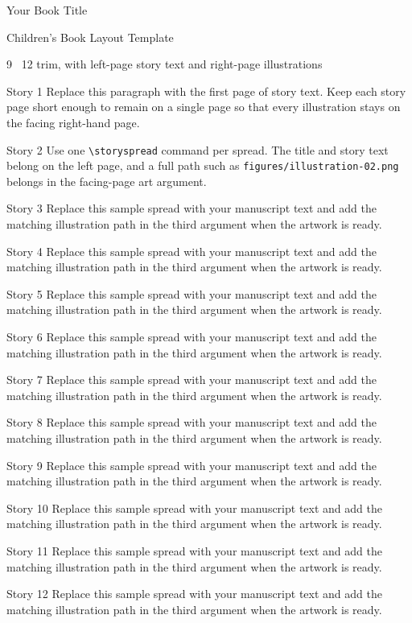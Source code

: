 \documentclass[10pt,twoside,openany]{book}
\newcommand{\booktitle}{Your Book Title}
\newcommand{\samplebookspread}[1]{%
  \storyspread
    {Story #1}
    {Replace this sample spread with your manuscript text and add the matching illustration path in the third argument when the artwork is ready.}
    {}
}
\begin{document}
\begin{titlepage}
  \thispagestyle{empty}
  \vspace*{\fill}
  \begin{center}
    {\chapterfont\fontsize{34}{40}\selectfont \booktitle\par}
    \vspace{1.5em}
    {\headingfont\fontsize{18}{24}\selectfont Children's Book Layout Template\par}
    \vspace{2em}
    {\Large 9 \texttimes\ 12 trim, with left-page story text and right-page illustrations\par}
  \end{center}
  \vspace*{\fill}
\end{titlepage}

\storyspread
  {Story 1}
  {Replace this paragraph with the first page of story text. Keep each story page short enough to remain on a single page so that every illustration stays on the facing right-hand page.}
  {}

\storyspread
  {Story 2}
  {Use one \texttt{\textbackslash storyspread} command per spread. The title and story text belong on the left page, and a full path such as \texttt{figures/illustration-02.png} belongs in the facing-page art argument.}
  {}

\samplebookspread{3}
\samplebookspread{4}
\samplebookspread{5}
\samplebookspread{6}
\samplebookspread{7}
\samplebookspread{8}
\samplebookspread{9}
\samplebookspread{10}
\samplebookspread{11}
\samplebookspread{12}
\end{document}
